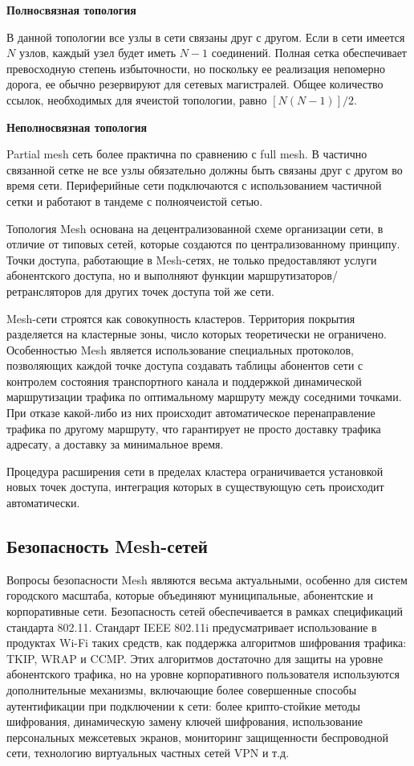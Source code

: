 \documentclass[a4paper]{article}
\begin{document}
\textbf{Полноcвязная топология} \par

В данной топологии все узлы в сети связаны друг с другом. Если в сети имеется $N$ узлов, каждый узел будет иметь $N-1$ соединений.
 Полная сетка обеспечивает превосходную степень избыточности, но поскольку ее реализация непомерно дорога, ее обычно резервируют для сетевых магистралей.
 Общее количество ссылок, необходимых для ячеистой топологии, равно $[N(N-1)]/2$.

\textbf{Неполносвязная топология}

Partial mesh сеть более практична по сравнению с full mesh. В частично связанной сетке не все узлы обязательно должны быть связаны друг с другом во время сети. 
Периферийные сети подключаются с использованием частичной сетки и работают в тандеме с полноячеистой сетью.

Топология Mesh основана на децентрализованной схеме организации сети, в отличие от типовых сетей, которые создаются по централизованному принципу.
 Точки доступа, работающие в Mesh-сетях, не только предоставляют услуги абонентского доступа, но и выполняют функции маршрутизаторов/ретрансляторов для других точек доступа той же сети. 

Mesh-сети строятся как совокупность кластеров. Территория покрытия разделяется на кластерные зоны, число которых теоретически не ограничено. 
Особенностью Mesh является использование специальных протоколов, позволяющих каждой точке доступа создавать таблицы абонентов сети с контролем состояния транспортного канала и поддержкой динамической маршрутизации трафика по оптимальному маршруту между соседними точками. 
При отказе какой-либо из них происходит автоматическое перенаправление трафика по другому маршруту, что гарантирует не просто доставку трафика адресату, а доставку за минимальное время.

Процедура расширения сети в пределах кластера ограничивается установкой новых точек доступа, интеграция которых в существующую сеть происходит автоматически.

\subsection{Безопасность Mesh-сетей}

Вопросы безопасности Mesh  являются весьма актуальными, особенно для систем городского масштаба, которые объединяют муниципальные, абонентские и корпоративные сети. 
Безопасность сетей обеспечивается в рамках спецификаций стандарта 802.11. Стандарт IEEE 802.11i предусматривает использование в продуктах Wi-Fi таких средств, как поддержка алгоритмов шифрования трафика: TKIP, WRAP и CCMP.
 Этих алгоритмов достаточно для защиты на уровне абонентского трафика, но на уровне корпоративного пользователя используются дополнительные механизмы, включающие более совершенные способы аутентификации при подключении к сети: более крипто-стойкие методы шифрования, динамическую замену ключей шифрования, использование персональных межсетевых экранов, мониторинг защищенности беспроводной сети, технологию виртуальных частных сетей VPN и т.д.
\end{document}
